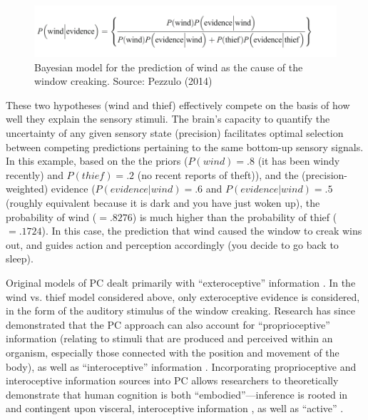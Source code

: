 \begin{CJK}{UTF8}{gbsn}
\begin{figure}[htbp]
  \begin{center}
    \includegraphics[scale=.5]{images/windThief.png}
      \caption{Bayesian model for the prediction of wind as the cause of the window creaking. Source: Pezzulo (2014)}
        \label{fig:windThief}
   \end{center}
\end{figure}

These two hypotheses (wind and thief) effectively compete on the basis of how well they explain the sensory stimuli.  The brain's capacity to quantify the uncertainty of any given sensory state (precision) facilitates optimal selection between competing predictions pertaining to the same bottom-up sensory signals.  In this example, based on the the priors ($P(wind) = .8$ (it has been windy recently) and $P(thief) = .2$ (no recent reports of theft)), and the (precision-weighted) evidence ($P(evidence|wind) = .6$ and $P(evidence|wind) = .5$ (roughly equivalent because it is dark and you have just woken up), the probability of wind ($= .8276$) is much higher than the probability of thief ($= .1724$).  In this case, the prediction that wind caused the window to creak wins out, and guides action and perception accordingly (you decide to go back to sleep).


Original models of PC dealt primarily with ``exteroceptive'' information \citep[relating to stimuli that are external to an organism, i.e. visual, auditory, haptic perception][]{Rao1999,Friston2010}.  In the wind vs. thief model considered above, only exteroceptive evidence is considered, in the form of the auditory stimulus of the window creaking.  Research has since demonstrated that the PC approach can also account for ``proprioceptive'' information (relating to stimuli that are produced and perceived within an organism, especially those connected with the position and movement of the body), as well as ``interoceptive'' information  \citep[relating to stimuli produced within an organism, particularly by the body's organs (viscera) e.g., ``gut feelings,'' or elevated heart rate; see][]{Seth2013,FeldmanBarrett2015}.  Incorporating proprioceptive and interoceptive information sources into PC allows researchers to theoretically demonstrate that human cognition is both ``embodied''---inference is rooted in and contingent upon visceral, interoceptive information \citep[][]{Pezzulo2014}, as well as ``active'' \citep[in the sense that humans can move throughout the environment to reduce the discrepancy between proprioceptive predictions and actual body states, see][]{Friston2010,Clark2015}.


\end{CJK}
